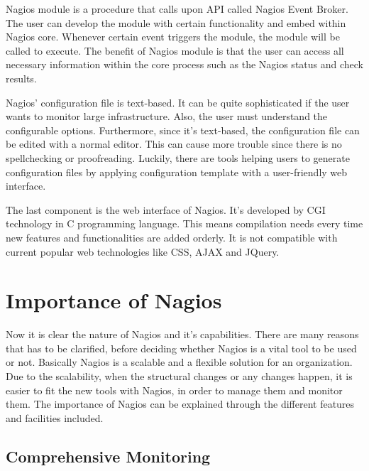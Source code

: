 \documentclass[9pt,twocolumn,twoside]{styles/osajnl}
\begin{document}
Nagios module is a procedure that calls upon API called Nagios Event Broker. The user can develop the module with certain functionality and embed within Nagios core. Whenever certain event triggers the module, the module will be called to execute. The benefit of Nagios module is that the user can access all necessary information within the core process such as the Nagios status and check results. 

Nagios' configuration file is text-based. It can be quite sophisticated if the user wants to monitor large infrastructure. Also, the user must understand the configurable options. Furthermore, since it's text-based, the configuration file can be edited with a normal editor. This can cause more trouble since there is no spellchecking or proofreading. Luckily, there are tools helping users to generate configuration files by applying configuration template with a user-friendly web interface.

The last component is the web interface of Nagios. It's developed by CGI technology in C programming language. This means compilation needs every time new features and functionalities are added orderly. It is not compatible with current popular web technologies like CSS, AJAX and JQuery.

\section{Importance of Nagios}

Now it is clear the nature of Nagios and it's capabilities. There are many reasons that has to be clarified, before deciding whether Nagios is a vital tool to be used or not. Basically Nagios is a scalable and a flexible solution for an organization. Due to the scalability, when the structural changes or any changes happen, it is easier to fit the new tools with Nagios, in order to manage them and monitor them. The importance of Nagios can be explained through the different features and facilities included. 

\subsection{Comprehensive Monitoring}
\end{document}
